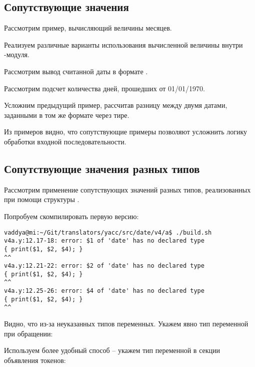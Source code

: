 \subsection{Сопутствующие значения}

Рассмотрим пример, вычисляющий величины месяцев.


Реализуем различные варианты использования вычисленной величины внутри -модуля.

Рассмотрим вывод считанной даты в формате .



Рассмотрим подсчет количества дней, прошедших от 01/01/1970.



Усложним предыдущий пример, рассчитав разницу между двумя датами, заданными в том же формате через тире.



Из примеров видно, что сопутствующие примеры позволяют усложнить логику обработки входной последовательности.

\subsection{Сопутствующие значения разных типов}

Рассмотрим применение сопутствующих значений разных типов, реализованных при помощи структуры .

Попробуем скомпилировать первую версию:
\begin{lstlisting}[caption={SQL},label={lst:sql}]
vaddya@mi:~/Git/translators/yacc/src/date/v4/a$ ./build.sh 
v4a.y:12.17-18: error: $1 of 'date' has no declared type
{ print($1, $2, $4); }
^^
v4a.y:12.21-22: error: $2 of 'date' has no declared type
{ print($1, $2, $4); }
^^
v4a.y:12.25-26: error: $4 of 'date' has no declared type
{ print($1, $2, $4); }
^^
\end{lstlisting}

Видно, что из-за неуказанных типов переменных. Укажем явно тип переменной при обращении:



Используем более удобный способ -- укажем тип переменной в секции объявления токенов:


